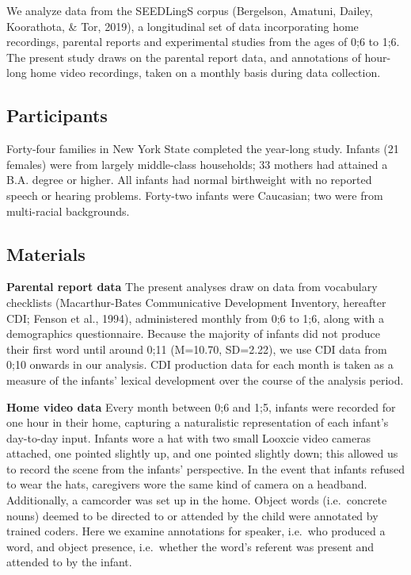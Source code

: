 \documentclass[
  english,
  man,floatsintext]{apa6}
\begin{document}
We analyze data from the SEEDLingS corpus (Bergelson, Amatuni, Dailey, Koorathota, \& Tor, 2019), a longitudinal set of data incorporating home recordings, parental reports and experimental studies from the ages of 0;6 to 1;6. The present study draws on the parental report data, and annotations of hour-long home video recordings, taken on a monthly basis during data collection.

\hypertarget{participants}{%
\subsection{Participants}\label{participants}}

Forty-four families in New York State completed the year-long study. Infants (21 females) were from largely middle-class households; 33 mothers had attained a B.A. degree or higher. All infants had normal birthweight with no reported speech or hearing problems. Forty-two infants were Caucasian; two were from multi-racial backgrounds.

\hypertarget{materials}{%
\subsection{Materials}\label{materials}}

\textbf{Parental report data} The present analyses draw on data from vocabulary checklists (Macarthur-Bates Communicative Development Inventory, hereafter CDI; Fenson et al., 1994), administered monthly from 0;6 to 1;6, along with a demographics questionnaire. Because the majority of infants did not produce their first word until around 0;11 (M=10.70, SD=2.22), we use CDI data from 0;10 onwards in our analysis. CDI production data for each month is taken as a measure of the infants' lexical development over the course of the analysis period.

\textbf{Home video data} Every month between 0;6 and 1;5, infants were recorded for one hour in their home, capturing a naturalistic representation of each infant's day-to-day input. Infants wore a hat with two small Looxcie video cameras attached, one pointed slightly up, and one pointed slightly down; this allowed us to record the scene from the infants' perspective. In the event that infants refused to wear the hats, caregivers wore the same kind of camera on a headband. Additionally, a camcorder was set up in the home. Object words (i.e.~concrete nouns) deemed to be directed to or attended by the child were annotated by trained coders. Here we examine annotations for speaker, i.e.~who produced a word, and object presence, i.e.~whether the word's referent was present and attended to by the infant.
\end{document}
